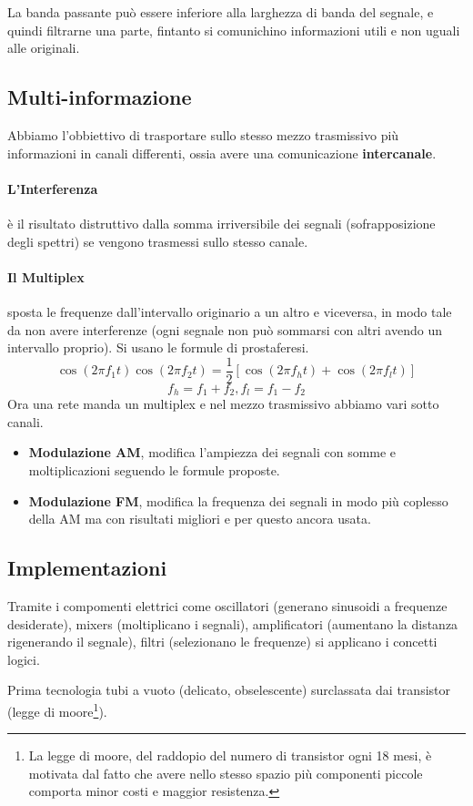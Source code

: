 \medskip

\noindent La banda passante può essere inferiore alla larghezza di banda del segnale, e quindi filtrarne una parte, fintanto si comunichino informazioni utili e non uguali alle originali.
\subsection{Multi-informazione}
Abbiamo l'obbiettivo di trasportare sullo stesso mezzo trasmissivo più informazioni in canali differenti, ossia avere una comunicazione \textbf{intercanale}.
\paragraph{L'Interferenza} è il risultato distruttivo dalla somma irriversibile dei segnali (sofrapposizione degli spettri) se vengono trasmessi sullo stesso canale.
\paragraph{Il Multiplex} sposta le frequenze dall'intervallo originario a un altro e viceversa, in modo tale da non avere interferenze (ogni segnale non può sommarsi con altri avendo un intervallo proprio). Si usano le formule di prostaferesi. \[\cos(2\pi f_1t)\cos(2\pi f_2t)=\frac{1}{2}[\cos(2\pi f_ht)+\cos(2\pi f_lt)]\]\[f_h=f_1+f_2, f_l=f_1-f_2\]
Ora una rete manda un multiplex e nel mezzo trasmissivo abbiamo vari sotto canali.
\begin{itemize}
	\item \textbf{Modulazione AM}, modifica l'ampiezza dei segnali con somme e moltiplicazioni seguendo le formule proposte.
	\item \textbf{Modulazione FM}, modifica la frequenza dei segnali in modo più coplesso della AM ma con risultati migliori e per questo ancora usata.
\end{itemize}
\subsection{Implementazioni}
Tramite i compomenti elettrici come oscillatori (generano sinusoidi a frequenze desiderate), mixers (moltiplicano i segnali), amplificatori (aumentano la distanza rigenerando il segnale), filtri (selezionano le frequenze) si applicano i concetti logici.

Prima tecnologia tubi a vuoto (delicato, obselescente) surclassata dai transistor (legge di moore\footnote{La legge di moore, del raddopio del numero di transistor ogni 18 mesi, è motivata dal fatto che avere nello stesso spazio più componenti piccole comporta minor costi e maggior resistenza.}).
